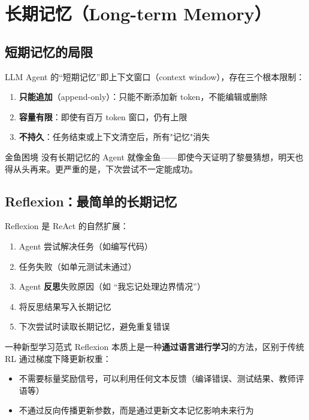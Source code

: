 \section{长期记忆（Long-term Memory）}

\subsection{短期记忆的局限}

LLM Agent 的``短期记忆''即上下文窗口（context window），存在三个根本限制：

\begin{enumerate}
    \item \textbf{只能追加}（append-only）：只能不断添加新 token，不能编辑或删除
    \item \textbf{容量有限}：即使有百万 token 窗口，仍有上限
    \item \textbf{不持久}：任务结束或上下文清空后，所有"记忆"消失
\end{enumerate}

\begin{warningbox}{金鱼困境}
没有长期记忆的 Agent 就像金鱼——即使今天证明了黎曼猜想，明天也得从头再来。更严重的是，下次尝试不一定能成功。
\end{warningbox}

\subsection{Reflexion：最简单的长期记忆}

Reflexion 是 ReAct 的自然扩展：

\begin{enumerate}
    \item Agent 尝试解决任务（如编写代码）
    \item 任务失败（如单元测试未通过）
    \item Agent \textbf{反思}失败原因（如 ``我忘记处理边界情况''）
    \item 将反思结果写入长期记忆
    \item 下次尝试时读取长期记忆，避免重复错误
\end{enumerate}

\begin{knowledgebox}{一种新型学习范式}
Reflexion 本质上是一种\textbf{通过语言进行学习}的方法，区别于传统 RL 通过梯度下降更新权重：
\begin{itemize}
    \item 不需要标量奖励信号，可以利用任何文本反馈（编译错误、测试结果、教师评语等）
    \item 不通过反向传播更新参数，而是通过更新文本记忆影响未来行为
\end{itemize}
\end{knowledgebox}

